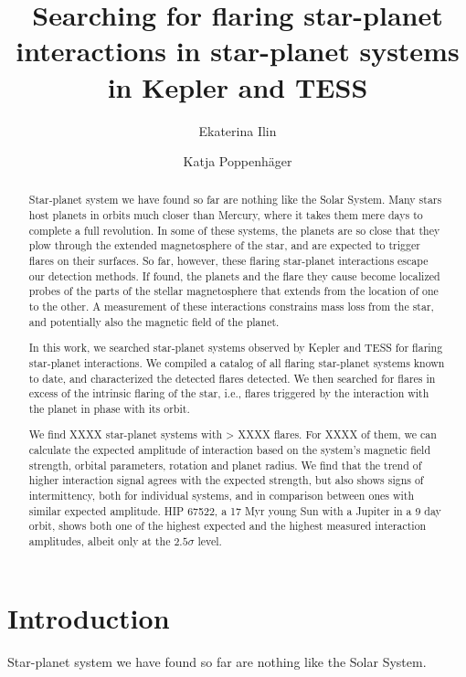 \documentclass[twocolumn]{aastex631}
\begin{document}
\title{Searching for flaring star-planet interactions in star-planet systems in Kepler and TESS}

\author{Ekaterina Ilin}
\author{Katja Poppenh\"ager}

\begin{abstract}
    Star-planet system we have found so far are nothing like the Solar System. Many stars host planets in orbits much closer than Mercury, where it takes them mere days to complete a full revolution. In some of these systems, the planets are so close that they plow through the extended magnetosphere of the star, and are expected to trigger flares on their surfaces. So far, however, these flaring star-planet interactions escape our detection methods. If found, the planets and the flare they cause become localized probes of the parts of the stellar magnetosphere that extends from the location of one to the other. A measurement of these interactions constrains mass loss from the star, and potentially also the magnetic field of the planet. 

    In this work, we searched star-planet systems observed by Kepler and TESS for flaring star-planet interactions. We compiled a catalog of all flaring star-planet systems known to date, and characterized the detected flares detected. We then searched for flares in excess of the intrinsic flaring of the star, i.e., flares triggered by the interaction with the planet in phase with its orbit. 

    We find XXXX star-planet systems with > XXXX flares. For XXXX of them, we can calculate the expected amplitude of interaction based on the system's magnetic field strength, orbital parameters, rotation and planet radius. We find that the trend of higher interaction signal agrees with the expected strength, but also shows signs of intermittency, both for individual systems, and in comparison between ones with similar expected amplitude. HIP 67522, a 17 Myr young Sun with a Jupiter in a 9 day orbit, shows both one of the highest expected and the highest measured interaction amplitudes, albeit only at the $2.5\sigma$ level. 
\end{abstract}

\section{Introduction}
\label{sec:intro}
Star-planet system we have found so far are nothing like the Solar System.
\end{document}
